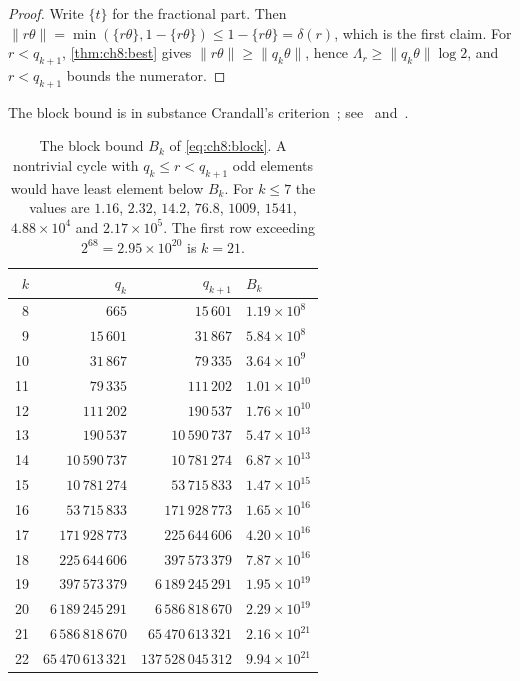 \begin{proof}
Write $\{t\}$ for the fractional part. Then
$\|r\theta\|=\min(\{r\theta\},1-\{r\theta\})\leq1-\{r\theta\}=\delta(r)$,
which is the first claim. For $r<q_{k+1}$, \cref{thm:ch8:best} gives
$\|r\theta\|\geq\|q_k\theta\|$, hence $\Lambda_r\geq\|q_k\theta\|\log2$, and
$r<q_{k+1}$ bounds the numerator.
\end{proof}

The block bound is in substance Crandall's criterion~\cite{crandall1978}; see~\cite[Theorem~I]{lagarias1985} and~\cite[Lemma~1]{simons2005}.

\begin{table}[ht]
\centering
\caption{The block bound $B_k$ of \eqref{eq:ch8:block}. A nontrivial cycle
with $q_k\leq r<q_{k+1}$ odd elements would have least element below $B_k$.
For $k\leq7$ the values are $1.16$, $2.32$, $14.2$, $76.8$, $1009$, $1541$,
$4.88\times10^4$ and $2.17\times10^5$. The first row exceeding
$2^{68}=2.95\times10^{20}$ is $k=21$.}
\label{tab:cycles}
\begin{tabular}{@{}rrrl@{}}
\toprule
$k$ & $q_k$ & $q_{k+1}$ & $B_k$ \\
\midrule
 8 & $665$ & $15\,601$ & $1.19\times10^{8}$ \\
 9 & $15\,601$ & $31\,867$ & $5.84\times10^{8}$ \\
10 & $31\,867$ & $79\,335$ & $3.64\times10^{9}$ \\
11 & $79\,335$ & $111\,202$ & $1.01\times10^{10}$ \\
12 & $111\,202$ & $190\,537$ & $1.76\times10^{10}$ \\
13 & $190\,537$ & $10\,590\,737$ & $5.47\times10^{13}$ \\
14 & $10\,590\,737$ & $10\,781\,274$ & $6.87\times10^{13}$ \\
15 & $10\,781\,274$ & $53\,715\,833$ & $1.47\times10^{15}$ \\
16 & $53\,715\,833$ & $171\,928\,773$ & $1.65\times10^{16}$ \\
17 & $171\,928\,773$ & $225\,644\,606$ & $4.20\times10^{16}$ \\
18 & $225\,644\,606$ & $397\,573\,379$ & $7.87\times10^{16}$ \\
19 & $397\,573\,379$ & $6\,189\,245\,291$ & $1.95\times10^{19}$ \\
20 & $6\,189\,245\,291$ & $6\,586\,818\,670$ & $2.29\times10^{19}$ \\
21 & $6\,586\,818\,670$ & $65\,470\,613\,321$ & $2.16\times10^{21}$ \\
22 & $65\,470\,613\,321$ & $137\,528\,045\,312$ & $9.94\times10^{21}$ \\
\bottomrule
\end{tabular}
\end{table}


